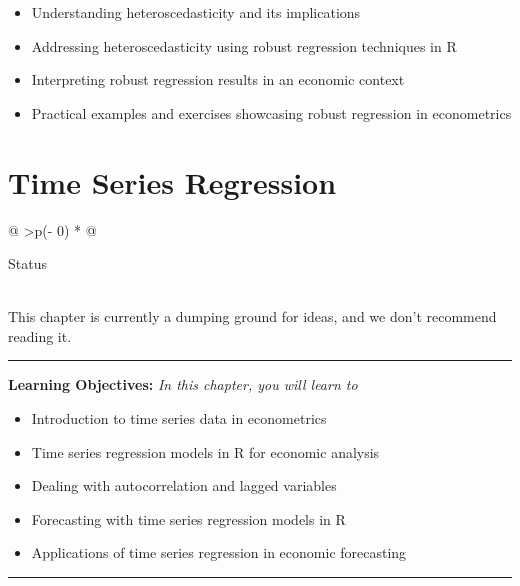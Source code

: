 \documentclass[
  letterpaper,
  twoside,
  openright,
  headsepline,
  footsepline,
  listof = totocnumbered,
  chapterprefix = true,
  titlepage = false]{scrbook}
\providecommand{\abstractname}{Learning Objectives} %
\newenvironment{objectives}[1]{%
	\hrule
	\vspace{5pt}
	\small\textbf{\abstractname: } 
	\newline
	\vspace{0.1cm}
	\small\emph{#1} %
	\itshape %
}{%
	\vspace{5pt}
	\hrule
	\vspace{0.6cm}
}
\begin{document}
\begin{itemize}
\item
  Understanding heteroscedasticity and its implications
\item
  Addressing heteroscedasticity using robust regression techniques in R
\item
  Interpreting robust regression results in an economic context
\item
  Practical examples and exercises showcasing robust regression in
  econometrics
\end{itemize}


\hypertarget{time-series-regression}{%
\chapter{Time Series Regression}\label{time-series-regression}}

\begin{longtable}[]{@{}
  >{\centering\arraybackslash}p{(\columnwidth - 0\tabcolsep) * }@{}}
\toprule\noalign{}
\begin{minipage}[b]{\linewidth}\centering
Status
\end{minipage} \\
\midrule\noalign{}
\endhead
\bottomrule\noalign{}
\endlastfoot
This chapter is currently a dumping ground for ideas, and we don't
recommend reading it. \\
\end{longtable}

\begin{objectives}{In this chapter, you will learn to}
\begin{itemize}

\item{Introduction to time series data in econometrics}

\item{Time series regression models in R for economic analysis}

\item{Dealing with autocorrelation and lagged variables}

\item{Forecasting with time series regression models in R}

\item{Applications of time series regression in economic forecasting}

\end{itemize}

\end{objectives}
\end{document}
